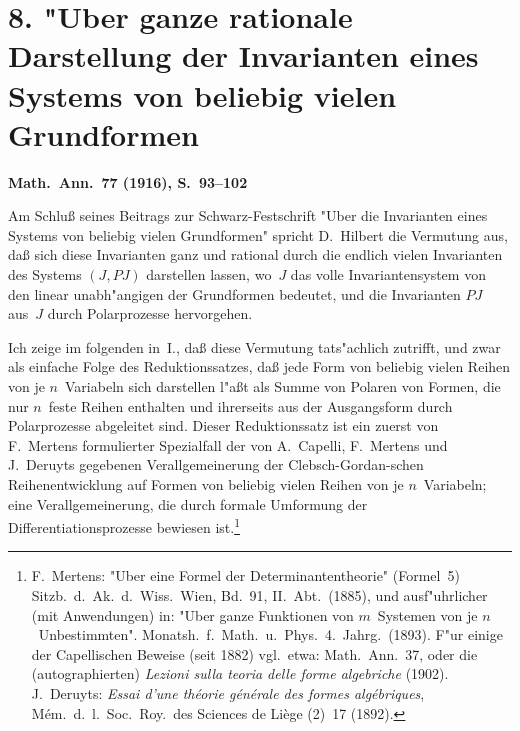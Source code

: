 \documentclass[11pt,a4paper]{article}
\begin{document}
\section*{8. "{U}ber ganze rationale Darstellung der Invarianten eines\\
Systems von beliebig vielen Grundformen}

\textbf{Math.\ Ann.\ 77 (1916), S.\ 93--102}

\smallskip
\noindent
Am Schlu\ss{} seines Beitrags zur Schwarz-Festschrift "{U}ber die Invarianten
eines Systems von beliebig vielen Grundformen"{} spricht D.~Hilbert die
Vermutung aus, da\ss{} sich diese Invarianten ganz und rational durch die
endlich vielen Invarianten des Systems $(J,PJ)$ darstellen lassen, wo~$J$
das volle Invariantensystem von den linear unabh"{a}ngigen der Grundformen
bedeutet, und die Invarianten $PJ$ aus~$J$ durch Polarprozesse hervorgehen.

Ich zeige im folgenden in~I., da\ss{} diese Vermutung tats"{a}chlich zutrifft,
und zwar als einfache Folge des Reduktionssatzes, da\ss{} jede Form von
beliebig vielen Reihen von je $n$~Variabeln sich darstellen l"{a}\ss{}t als Summe
von Polaren von Formen, die nur $n$~feste Reihen enthalten und ihrerseits
aus der Ausgangsform durch Polarprozesse abgeleitet sind. Dieser
Reduktionssatz ist ein zuerst von F.~Mertens formulierter Spezialfall der
von A.~Capelli, F.~Mertens und J.~Deruyts gegebenen Verallgemeinerung
der Clebsch-Gordan-\linebreak schen Reihenentwicklung auf Formen von beliebig vielen
Reihen von je $n$~Variabeln; eine Verallgemeinerung, die durch formale
Umformung der Differentiationsprozesse bewiesen ist.\footnote{F.~Mertens:
"{U}ber eine Formel der Determinantentheorie"{} (Formel~5) Sitzb.\ d.\ Ak.\ d.\ Wiss.\ Wien, Bd.\ 91, II.\ Abt.\ (1885), und ausf"{u}hrlicher (mit Anwendungen) in:
"{U}ber ganze Funktionen von $m$~Systemen von je $n$~Unbestimmten"{}.
Monatsh.\ f.\ Math.\ u.\ Phys.\ 4.\ Jahrg.\ (1893). F"{u}r einige der Capellischen
Beweise (seit 1882) vgl.\ etwa: Math.\ Ann.\ 37, oder die (autographierten)
\emph{Lezioni sulla teoria delle forme algebriche} (1902). J.~Deruyts:
\emph{Essai d'une th\'{e}orie g\'{e}n\'{e}rale des formes alg\'{e}briques}, M\'{e}m.\ d.\ l.\ Soc.\ Roy.\ des
Sciences de Liège (2)~17 (1892).}
\end{document}
